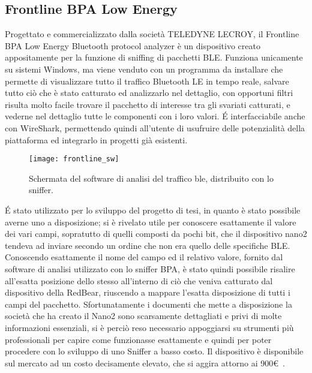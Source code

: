 \subsection*{Frontline BPA Low Energy}
Progettato e commercializzato dalla società TELEDYNE LECROY, il Frontline BPA Low Energy Bluetooth protocol analyzer è un dispositivo creato appositamente per la funzione di sniffing di pacchetti BLE. Funziona unicamente su sistemi Windows, ma viene venduto con un programma da installare che permette di visualizzare tutto il traffico Bluetooth LE in tempo reale, salvare tutto ciò che è stato catturato ed analizzarlo nel dettaglio, con opportuni filtri risulta molto facile trovare il pacchetto di interesse tra gli svariati catturati, e vederne nel dettaglio tutte le componenti con i loro valori. \'E interfacciabile anche con WireShark, permettendo quindi all'utente di usufruire delle potenzialità della piattaforma ed integrarlo in progetti già esistenti.

\begin{figure}[H]
\texttt{[image: frontline\_sw]}
\centering
\caption{Schermata del software di analisi del traffico ble, distribuito con lo sniffer. }
\end{figure}

\'E stato utilizzato per lo sviluppo del progetto di tesi, in quanto è stato possibile averne uno a disposizione; si è rivelato utile per conoscere esattamente il valore dei vari campi, sopratutto di quelli composti da pochi bit, che il dispositivo nano2 tendeva ad inviare secondo un ordine che non era quello delle specifiche BLE. Conoscendo esattamente il nome del campo ed il relativo valore, fornito dal software di analisi utilizzato con lo sniffer BPA, è stato quindi possibile risalire all'esatta posizione dello stesso all'interno di ciò che veniva catturato dal dispositivo della RedBear, riuscendo a mappare l'esatta disposizione di tutti i campi del pacchetto. Sfortunatamente i documenti che mette a disposizione la società che ha creato il Nano2 sono scarsamente dettagliati e privi di molte informazioni essenziali, si è perciò reso necessario appoggiarsi su strumenti più professionali per capire come funzionasse esattamente e quindi per poter procedere con lo sviluppo di uno Sniffer a basso costo.
Il dispositivo è disponibile sul mercato ad un costo decisamente elevato, che si aggira attorno ai 900\euro\ .